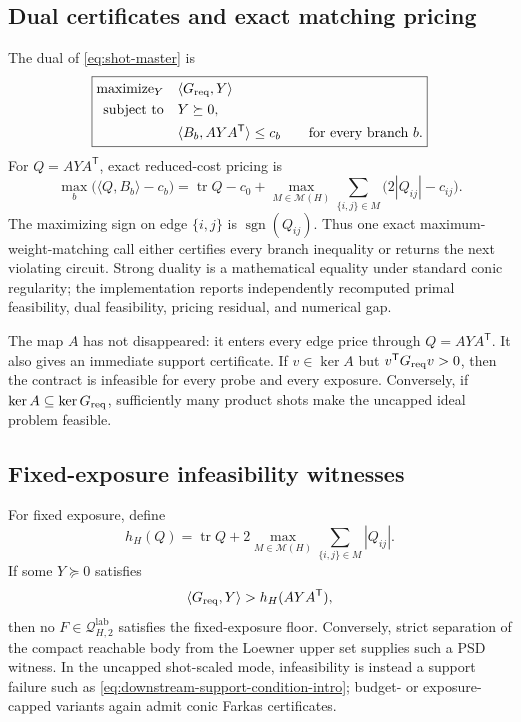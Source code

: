 \documentclass[11pt]{article}
\theoremstyle{definition}
\theoremstyle{remark}
\newcommand{\Q}{\mathcal{Q}}
\newcommand{\tr}{\operatorname{tr}}
\newcommand{\sgn}{\operatorname{sgn}}
\newcommand{\lab}{\mathrm{lab}}
\begin{document}
\subsection{Dual certificates and exact matching pricing}
The dual of \cref{eq:shot-master} is
\begin{equation}
\boxed{
\begin{aligned}
  \text{maximize}_{Y}\quad &\langle G_{\rm req},Y\rangle\\
  \text{subject to}\quad &Y\succeq0,\\
  &\langle B_b,AYA^{\mathsf T}\rangle\le c_b\qquad\text{for every branch }b.
\end{aligned}}
\label{eq:shot-dual}
\end{equation}
For $Q=AYA^{\mathsf T}$, exact reduced-cost pricing is
\begin{equation}
\max_b\bigl(\langle Q,B_b\rangle-c_b\bigr)
=\tr Q-c_0+
\max_{M\in\mathcal M(H)}\sum_{\{i,j\}\in M}\bigl(2|Q_{ij}|-c_{ij}\bigr).
\label{eq:shot-pricing}
\end{equation}
The maximizing sign on edge $\{i,j\}$ is $\sgn(Q_{ij})$. Thus one exact maximum-weight-matching call either certifies every branch inequality or returns the next violating circuit. Strong duality is a mathematical equality under standard conic regularity; the implementation reports independently recomputed primal feasibility, dual feasibility, pricing residual, and numerical gap.

The map $A$ has not disappeared: it enters every edge price through $Q=AYA^{\mathsf T}$. It also gives an immediate support certificate. If $v\in\ker A$ but $v^{\mathsf T}G_{\rm req}v>0$, then the contract is infeasible for every probe and every exposure. Conversely, if $\ker A\subseteq\ker G_{\rm req}$, sufficiently many product shots make the uncapped ideal problem feasible.

\subsection{Fixed-exposure infeasibility witnesses}
For fixed exposure, define
\begin{equation}
  h_H(Q)=\tr Q+2\max_{M\in\mathcal M(H)}\sum_{\{i,j\}\in M}|Q_{ij}|.
  \label{eq:floor-support-witness}
\end{equation}
If some $Y\succeq0$ satisfies
\begin{equation}
  \langle G_{\rm req},Y\rangle>h_H(AYA^{\mathsf T}),
  \label{eq:floor-infeasible-certificate}
\end{equation}
then no $F\in\Q^{\lab}_{H,2}$ satisfies the fixed-exposure floor. Conversely, strict separation of the compact reachable body from the Loewner upper set supplies such a PSD witness. In the uncapped shot-scaled mode, infeasibility is instead a support failure such as \cref{eq:downstream-support-condition-intro}; budget- or exposure-capped variants again admit conic Farkas certificates.
\end{document}
